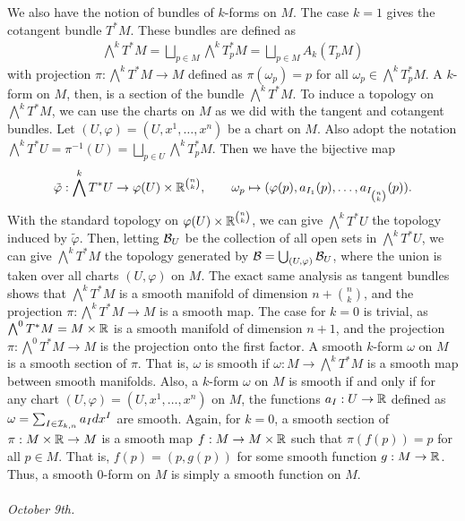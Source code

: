 We also have the notion of bundles of $k$-forms on $M$. The case $k=1$ gives the cotangent bundle $T^{\ast}M$. These bundles are defined as
\begin{align}
    \bigwedge^{k}T^{\ast}M = \bigsqcup_{p \in M} \bigwedge^{k}T_{p}^{\ast}M = \bigsqcup_{p \in M} A_{k}(T_{p}M)
\end{align}
with projection $\pi:\bigwedge^{k}T^{\ast}M \to M$ defined as $\pi(\omega_{p}) = p$ for all $\omega_{p} \in \bigwedge^{k}T_{p}^{\ast}M$. A $k$-form on $M$, then, is a section of the bundle $\bigwedge^{k}T^{\ast}M$. To induce a topology on $\bigwedge^{k}T^{\ast}M$, we can use the charts on $M$ as we did with the tangent and cotangent bundles. Let $(U,\varphi) = (U,x^{1},\ldots,x^{n})$ be a chart on $M$. Also adopt the notation $\bigwedge^{k}T^{\ast}U = \pi^{-1}(U) = \bigsqcup_{p \in U} \bigwedge^{k}T_{p}^{\ast}M$. Then we have the bijective map
\begin{align}
    \tilde{\varphi}:\bigwedge^{k}T^{\ast}U \to \varphi(U) \times \mathbb{R}^{\binom{n}{k}}, \qquad \omega_{p} \mapsto (\varphi(p),a_{I_{1}}(p),\ldots,a_{I_{\binom{n}{k}}}(p)).
\end{align}
With the standard topology on $\varphi(U) \times \mathbb{R}^{\binom{n}{k}}$, we can give $\bigwedge^{k}T^{\ast}U$ the topology induced by $\tilde{\varphi}$. Then, letting $\mathcal{B}_{U}$ be the collection of all open sets in $\bigwedge^{k}T^{\ast}U$, we can give $\bigwedge^{k}T^{\ast}M$ the topology generated by $\mathcal{B} = \bigcup_{(U,\varphi)} \mathcal{B}_{U}$, where the union is taken over all charts $(U,\varphi)$ on $M$. The exact same analysis as tangent bundles shows that $\bigwedge^{k}T^{\ast}M$ is a smooth manifold of dimension $n + \binom{n}{k}$, and the projection $\pi:\bigwedge^{k}T^{\ast}M \to M$ is a smooth map. The case for $k = 0$ is trivial, as $\bigwedge^{0}T^{\ast}M = M \times \mathbb{R}$ is a smooth manifold of dimension $n+1$, and the projection $\pi:\bigwedge^{0}T^{\ast}M \to M$ is the projection onto the first factor. A smooth $k$-form $\omega$ on $M$ is a smooth section of $\pi$. That is, $\omega$ is smooth if $\omega:M \to \bigwedge^{k}T^{\ast}M$ is a smooth map between smooth manifolds. Also, a $k$-form $\omega$ on $M$ is smooth if and only if for any chart $(U,\varphi) = (U,x^{1},\ldots,x^{n})$ on $M$, the functions $a_{I}:U \to \mathbb{R}$ defined as $\omega = \sum_{I \in \mathcal{I}_{k,n}} a_{I} dx^{I}$ are smooth. Again, for $k = 0$, a smooth section of $\pi:M \times \mathbb{R} \to M$ is a smooth map $f:M \to M \times \mathbb{R}$ such that $\pi(f(p)) = p$ for all $p \in M$. That is, $f(p) = (p,g(p))$ for some smooth function $g:M \to \mathbb{R}$. Thus, a smooth 0-form on $M$ is simply a smooth function on $M$.
\\ \\
\textit{October 9th.}

